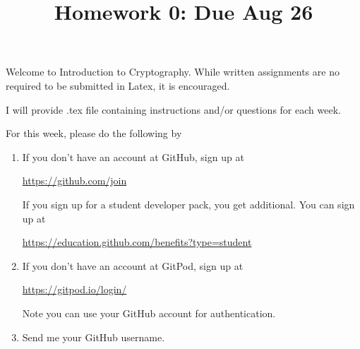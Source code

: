 \documentclass[12pt]{amsart}
\theoremstyle{definition}
\begin{document}
\title{Homework 0: Due Aug 26}

\maketitle

Welcome to Introduction to Cryptography. While written assignments are no required to be 
submitted in Latex, it is encouraged. 

I will provide .tex file containing instructions and/or questions for each week. 

For this week, please do the following by

\begin{enumerate}
	\item If you don't have an account at GitHub, sign up at 
		\begin{center}
			\href{https://github.com/join}{https://github.com/join}
		\end{center}
	If you sign up for a student developer pack, you get additional. You can sign up at 
		\begin{center}
			\href{https://education.github.com/benefits?type=student}{https://education.github.com/benefits?type=student}
		\end{center}
		
	\item If you don't have an account at GitPod, sign up at 
		\begin{center}
			\href{https://gitpod.io/login/}{https://gitpod.io/login/}
		\end{center}
	Note you can use your GitHub account for authentication. 
			
	\item Send me your GitHub username. 
\end{enumerate}
\end{document}
